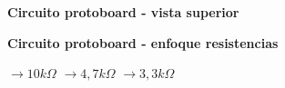 \begin{enumerate}
\begin{center}
\begin{tikzpicture}[x=2mm,y=2mm]

        \end{tikzpicture}
\end{center}
        \begin{center} \textbf{Circuito protoboard - vista superior} \end{center}
        \begin{center} \textbf{Circuito protoboard - enfoque resistencias} \end{center}
         $\rightarrow 10k\Omega$
         $\rightarrow 4,7k\Omega$
         $\rightarrow 3,3k\Omega$
\end{enumerate}
\saltoPag{}
